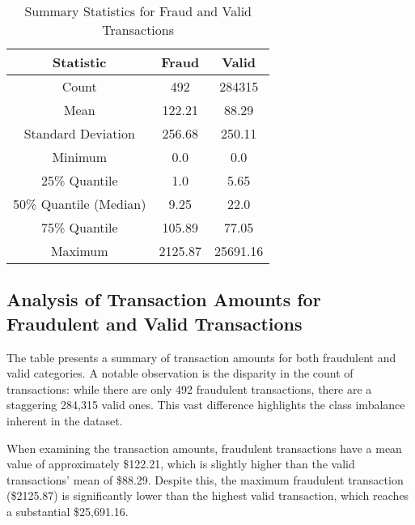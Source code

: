 \begin{table}[htbp]
    \caption{Summary Statistics for Fraud and Valid Transactions}
    \begin{center}
        \begin{tabular}{|c|c|c|}
            \hline
            \textbf{Statistic}     & \textbf{Fraud} & \textbf{Valid} \\
            \hline
            Count                  & 492            & 284315         \\
            \hline
            Mean                   & 122.21         & 88.29          \\
            \hline
            Standard Deviation     & 256.68         & 250.11         \\
            \hline
            Minimum                & 0.0            & 0.0            \\
            \hline
            25\% Quantile          & 1.0            & 5.65           \\
            \hline
            50\% Quantile (Median) & 9.25           & 22.0           \\
            \hline
            75\% Quantile          & 105.89         & 77.05          \\
            \hline
            Maximum                & 2125.87        & 25691.16       \\
            \hline
        \end{tabular}
        \label{tab:transaction_summary}
    \end{center}
\end{table}

\subsection{Analysis of Transaction Amounts for Fraudulent and Valid Transactions}

The table presents a summary of transaction amounts for both fraudulent and valid categories. A notable observation is the disparity in the count of transactions: while there are only 492 fraudulent transactions, there are a staggering 284,315 valid ones. This vast difference highlights the class imbalance inherent in the dataset.

When examining the transaction amounts, fraudulent transactions have a mean value of approximately \$122.21, which is slightly higher than the valid transactions' mean of \$88.29. Despite this, the maximum fraudulent transaction (\$2125.87) is significantly lower than the highest valid transaction, which reaches a substantial \$25,691.16.

